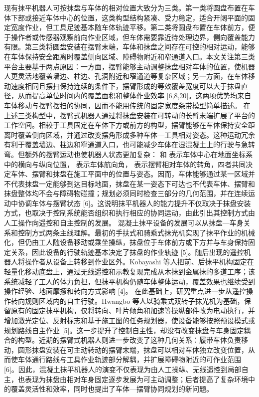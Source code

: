 {}现有抹平机器人可按抹盘与车体的相对位置大致分为三类。第一类将圆盘布置在车体下部或接近车体中心的位置，这类构型结构紧凑、受力稳定，适合开阔平面的固定宽度作业，但工具足迹基本随车体轨迹平移。第二类将圆盘布置在车体前方，便于操作者或传感器观察前向作业区域，但车体需要靠近待处理边界，侧向覆盖能力有限。第三类将圆盘安装在摆臂末端，车体和抹盘之间存在可控的相对运动，能够在车体保持安全距离时覆盖侧向区域、障碍物附近和窄通道入口。本文关注第三类平台主要基于两点原因：一方面，摆臂能够主动调整抹盘相对车体的位置，使机器人更灵活地覆盖墙边、柱边、孔洞附近和窄通道等复杂区域；另一方面，在车体移动速度相同且摆扫保持连续的条件下，摆臂形成的等效覆盖宽度可以大于抹盘直径，从而提高单位时间内的覆盖面积和整体作业效率 [6,8,20]。这两项优势均来自车体移动与摆臂摆扫的协同，因而不能用传统的固定宽度条带模型简单描述。\markdownRendererParagraphSeparator
{}\markdownRendererInterblockSeparator
{}在上述三类构型中，摆臂式机器人通过将抹盘安装在可转动的长臂末端扩展了平台的工作空间。相较于工具固定在车体下方或前方的构型，摆臂能够在车体保持安全距离时覆盖侧向区域，并通过改变摆角形成多种车体—工具相对姿态。这种运动冗余有利于覆盖墙边、柱边和窄通道入口，也可能减少车体在湿混凝土上的行驶与急转弯。但额外的摆臂运动也使机器人状态更加复杂： 和  表示车体中心在地面坐标系中的横向与纵向位置，\markdownRendererInlineMath{\theta} 表示车体航向角，\markdownRendererInlineMath{\phi} 表示摆臂相对车体的转角，四者共同决定车体、摆臂和抹盘在施工平面中的位置与姿态。因而，车体能够通过某一区域并不代表抹盘一定能够到达目标地面，抹盘在某一姿态下可达也不代表车体、摆臂和抹盘整体均不会与障碍物碰撞；规划必须同时检查三部分的几何范围，并在连续运动中协调车体与摆臂状态 [6]。这说明抹平机器人的能力提升不仅取决于抹盘安装方式，也取决于控制系统能否组织和执行相应的协同运动，由此引出其控制方式由人工操作向遥控和自主控制的发展。\markdownRendererParagraphSeparator
{}混凝土抹平设备的发展可以从抹盘—车身关系和控制方式两条主线理解。最初的手扶式和骑乘式抹光机实现了抹平作业的机械化，但仍由工人随设备移动或乘坐操纵，抹盘位于车体前方或下方并与车身保持固定关系，因此设备的行驶轨迹基本决定了抹盘的作业轨迹 [5]。随后出现的遥控机器人将操作者从设备上转移到作业区外。Kobayashi 等人把前、后抹平机构固定在轻量化移动底盘上，通过无线遥控和示教复现完成从木抹到金属抹的多道工序；该系统减轻了工人的体力负担，但抹平机构仍随车体整体运动，覆盖效果也继续受到操作经验、地面摩擦和转向方式影响 [4]。\markdownRendererParagraphSeparator
{}在此基础上，研究重点进一步从遥控操作转向规则区域内的自主行驶。Hwangbo 等人以骑乘式双转子抹光机为基础，保留原有的固定抹平机构，仅将转向、叶片倾角和加速等操纵部件改为电动执行，并增加激光定位、反射标志和基于施工图的任务规划器，使设备能够按照预设模式或规划路线自主作业 [5]。这一步提升了控制自主性，却没有改变抹盘与车身固定耦合的构型。近期的摆臂式机器人则进一步改变了这种几何关系：履带车体负责移动，圆形抹盘安装在可主动转动的摆臂末端，抹盘可以相对车体独立改变位置，从而使车体通行路线与工具作业轨迹部分解耦，并扩展障碍物附近的可作业范围 [6]。因此，混凝土抹平机器人的演变不仅表现为由人工操纵、无线遥控到局部自主，也表现为抹盘由相对车身固定逐步发展为可主动调整；后者提高了复杂环境中的覆盖灵活性和效率，同时也提出了车体—摆臂协同规划的新问题。\markdownRendererParagraphSeparator
